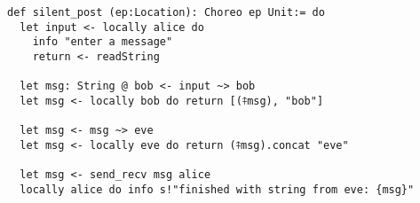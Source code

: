 \begin{lstlisting}[language=lean]
def silent_post (ep:Location): Choreo ep Unit:= do
  let input <- locally alice do
    info "enter a message"
    return <- readString

  let msg: String @ bob <- input ~> bob
  let msg <- locally bob do return [(⤉msg), "bob"]

  let msg <- msg ~> eve
  let msg <- locally eve do return (⤉msg).concat "eve"

  let msg <- send_recv msg alice
  locally alice do info s!"finished with string from eve: {msg}"
\end{lstlisting}
